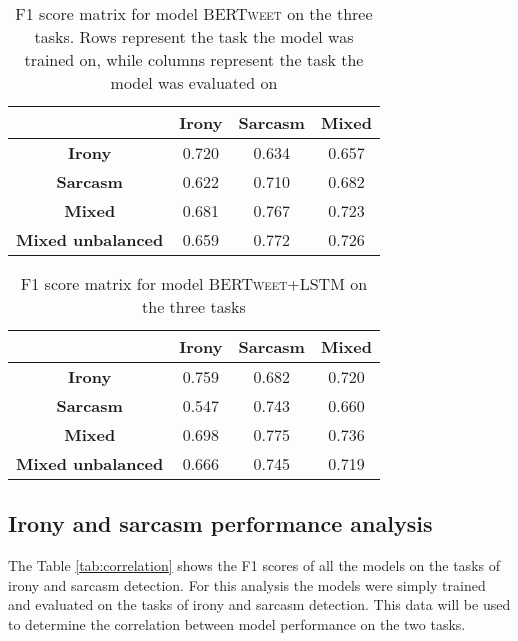\documentclass[10pt, a4paper]{article}
\begin{document}
\begin{table}[h!]
   \centering
   \begin{tabular}{|c|c|c|c|}
       \hline
        & \textbf{Irony} & \textbf{Sarcasm} & \textbf{Mixed} \\ \hline
       \textbf{Irony} & 0.720 & 0.634 & 0.657 \\ \hline
       \textbf{Sarcasm} & 0.622 & 0.710 & 0.682 \\ \hline
       \textbf{Mixed} & 0.681 & 0.767 & 0.723 \\ \hline
       \textbf{Mixed unbalanced} & 0.659 & 0.772 & 0.726\\ \hline
   \end{tabular}
   \caption{F1 score matrix for model \textsc{BERTweet} on the three tasks. Rows represent the task the model was trained on, 
   while columns represent the task the model was evaluated on}
   \label{tab:bertweet-results}
\end{table}

\begin{table}[h!]
   \centering
   \begin{tabular}{|c|c|c|c|}
       \hline
       & \textbf{Irony} & \textbf{Sarcasm} & \textbf{Mixed} \\ \hline
       \textbf{Irony} & 0.759 & 0.682 & 0.720 \\ \hline
       \textbf{Sarcasm} & 0.547 & 0.743 & 0.660 \\ \hline
       \textbf{Mixed} & 0.698 & 0.775 & 0.736 \\ \hline
       \textbf{Mixed unbalanced} & 0.666 & 0.745 & 0.719\\ \hline
   \end{tabular}
   \caption{F1 score matrix for model \textsc{BERTweet+LSTM} on the three tasks}
   \label{tab:bertweet-bilstm-results}
\end{table}

\subsection{Irony and sarcasm performance analysis}\label{correlation}

The Table \ref{tab:correlation} shows the F1 scores of all the models on the tasks of irony and sarcasm detection.
For this analysis the models were simply trained and evaluated on the tasks of irony and sarcasm detection. 
This data will be used to determine the correlation between model performance on the two tasks.
\end{document}
